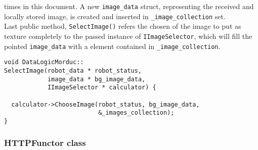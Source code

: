 times in this document. A new \texttt{image\_data} struct, representing
the received and locally stored image, is created and inserted in
\texttt{\_image\_collection} set.
\\
Last public method, \texttt{SelectImage()} refers the chosen of the image
to put as texture completely to the passed instance of
\texttt{IImageSelector}, which will fill the pointed \texttt{image\_data}
with a element contained in \texttt{\_image\_collection}.
\\
\begin{lstlisting}[caption={\texttt{DataLogicMorduc::SelectImage()} method},
    label={code:datalogicmorduc:selectimage}]
void DataLogicMorduc::
SelectImage(robot_data * robot_status,
            image_data * bg_image_data,
            IImageSelector * calculator) {

  calculator->ChooseImage(robot_status, bg_image_data,
                          &_images_collection);
}

\end{lstlisting}

\subsubsection{HTTPFunctor class}
\label{concr:idatalogic:datalogicmorduc:httpfunctor}

